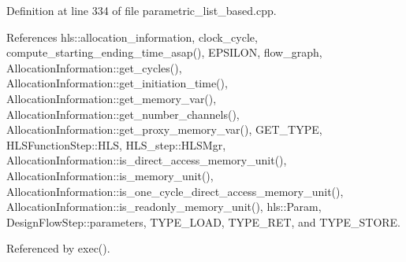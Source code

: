 Definition at line 334 of file parametric\+\_\+list\+\_\+based.\+cpp.



References hls\+::allocation\+\_\+information, clock\+\_\+cycle, compute\+\_\+starting\+\_\+ending\+\_\+time\+\_\+asap(), E\+P\+S\+I\+L\+ON, flow\+\_\+graph, Allocation\+Information\+::get\+\_\+cycles(), Allocation\+Information\+::get\+\_\+initiation\+\_\+time(), Allocation\+Information\+::get\+\_\+memory\+\_\+var(), Allocation\+Information\+::get\+\_\+number\+\_\+channels(), Allocation\+Information\+::get\+\_\+proxy\+\_\+memory\+\_\+var(), G\+E\+T\+\_\+\+T\+Y\+PE, H\+L\+S\+Function\+Step\+::\+H\+LS, H\+L\+S\+\_\+step\+::\+H\+L\+S\+Mgr, Allocation\+Information\+::is\+\_\+direct\+\_\+access\+\_\+memory\+\_\+unit(), Allocation\+Information\+::is\+\_\+memory\+\_\+unit(), Allocation\+Information\+::is\+\_\+one\+\_\+cycle\+\_\+direct\+\_\+access\+\_\+memory\+\_\+unit(), Allocation\+Information\+::is\+\_\+readonly\+\_\+memory\+\_\+unit(), hls\+::\+Param, Design\+Flow\+Step\+::parameters, T\+Y\+P\+E\+\_\+\+L\+O\+AD, T\+Y\+P\+E\+\_\+\+R\+ET, and T\+Y\+P\+E\+\_\+\+S\+T\+O\+RE.



Referenced by exec().


